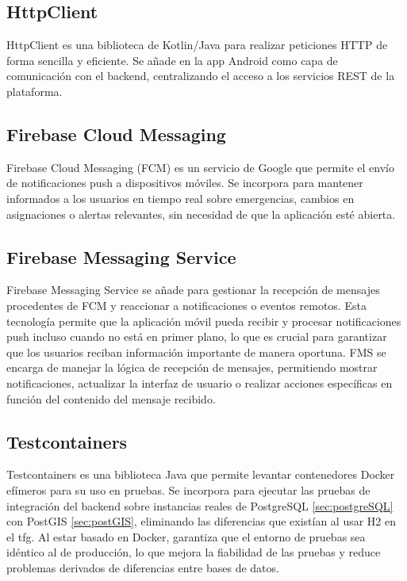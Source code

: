 \subsection{HttpClient}
HttpClient \cite{httpclient} es una biblioteca de Kotlin/Java para realizar peticiones HTTP de forma sencilla y eficiente. Se añade en la app Android como capa de comunicación con el backend, centralizando el acceso a los servicios REST de la plataforma.

\subsection{Firebase Cloud Messaging}
Firebase Cloud Messaging (FCM) \cite{firebase} es un servicio de Google que permite el envío de notificaciones push a dispositivos móviles. Se incorpora para mantener informados a los usuarios en tiempo real sobre emergencias, cambios en asignaciones o alertas relevantes, sin necesidad de que la aplicación esté abierta.

\subsection{Firebase Messaging Service}
Firebase Messaging Service \cite{firebase_messaging_service} se añade para gestionar la recepción de mensajes procedentes de FCM y reaccionar a notificaciones o eventos remotos. Esta tecnología permite que la aplicación móvil pueda recibir y procesar notificaciones push incluso cuando no está en primer plano, lo que es crucial para garantizar que los usuarios reciban información importante de manera oportuna. FMS se encarga de manejar la lógica de recepción de mensajes, permitiendo mostrar notificaciones, actualizar la interfaz de usuario o realizar acciones específicas en función del contenido del mensaje recibido.

\subsection{Testcontainers}
\label{sec:testcontainers}
Testcontainers \cite{testcontainers} es una biblioteca Java que permite levantar contenedores Docker efímeros para su uso en pruebas. Se incorpora para ejecutar las pruebas de integración del backend sobre instancias reales de PostgreSQL \ref{sec:postgreSQL} con PostGIS \ref{sec:postGIS}, eliminando las diferencias que existían al usar H2 en el \acrshort{tfg}. Al estar basado en Docker, garantiza que el entorno de pruebas sea idéntico al de producción, lo que mejora la fiabilidad de las pruebas y reduce problemas derivados de diferencias entre bases de datos.
